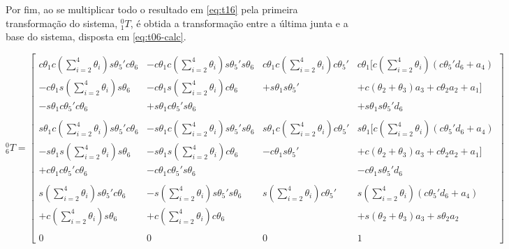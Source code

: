 Por fim, ao se multiplicar todo o resultado em \ref{eq:t16} pela primeira transformação do sistema, $^0_1T$, é obtida a transformação 
entre a última junta e a base do sistema, disposta em \ref{eq:t06-calc}.

\begin{equation}
    \label{eq:t06-calc}
    ^0_6T = \begin{bmatrix}
        c\theta_1c(\sum\limits_{i=2}^4\theta_i)s\theta_5'c\theta_6 & -c\theta_1c(\sum\limits_{i=2}^4\theta_i)s\theta_5's\theta_6 & c\theta_1c(\sum\limits_{i=2}^4\theta_i)c\theta_5' & c\theta_1[c(\sum\limits_{i=2}^4\theta_i)(c\theta_5'd_6 + a_4) \\
        -c\theta_1s(\sum\limits_{i=2}^4\theta_i)s\theta_6          & -c\theta_1s(\sum\limits_{i=2}^4\theta_i)c\theta_6           & +s\theta_1s\theta_5'                             & +c(\theta_2+\theta_3)a_3 + c\theta_2a_2 + a_1]\\
        -s\theta_1c\theta_5'c\theta_6                             & +s\theta_1c\theta_5's\theta_6                              &                                                  & +s\theta_1s\theta_5'd_6\\
        \\
        s\theta_1c(\sum\limits_{i=2}^4\theta_i)s\theta_5'c\theta_6 & -s\theta_1c(\sum\limits_{i=2}^4\theta_i)s\theta_5's\theta_6 & s\theta_1c(\sum\limits_{i=2}^4\theta_i)c\theta_5' & s\theta_1[c(\sum\limits_{i=2}^4\theta_i)(c\theta_5'd_6 + a_4) \\
        -s\theta_1s(\sum\limits_{i=2}^4\theta_i)s\theta_6          & -s\theta_1s(\sum\limits_{i=2}^4\theta_i)c\theta_6           & -c\theta_1s\theta_5'                             & +c(\theta_2+\theta_3)a_3 + c\theta_2a_2 + a_1]\\
        +c\theta_1c\theta_5'c\theta_6                             & -c\theta_1c\theta_5's\theta_6                              &                                                  & -c\theta_1s\theta_5'd_6\\
        \\
        s(\sum\limits_{i=2}^4\theta_i)s\theta_5'c\theta_6 & -s(\sum\limits_{i=2}^4\theta_i)s\theta_5's\theta_6 & s(\sum\limits_{i=2}^4\theta_i)c\theta_5' & s(\sum\limits_{i=2}^4\theta_i)(c\theta_5'd_6 + a_4) \\
        +c(\sum\limits_{i=2}^4\theta_i)s\theta_6          & +c(\sum\limits_{i=2}^4\theta_i)c\theta_6           &                                         & +s(\theta_2+\theta_3)a_3 + s\theta_2a_2 \\
        \\
        0 & 0 & 0 & 1
    \end{bmatrix}
\end{equation}

